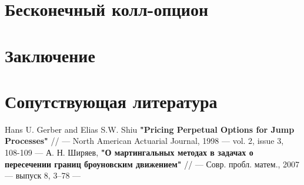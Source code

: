 \documentclass[a4paper,12pt]{article}
\theoremstyle{definition}
\begin{document}
\section{Бесконечный колл-опцион}

\section{Заключение}

\section{Сопутствующая литература}

\begin{thebibliography}{3}
Hans U. Gerber and Elias S.W. Shiu \textbf{"Pricing Perpetual Options for Jump Processes"} // --- North American Actuarial Journal, 1998 --- vol. 2, issue 3, 108-109 ---
А. Н. Ширяев, \textbf{"О мартингальных методах в задачах о пересечении границ броуновским движением"} // --- Совр. пробл. матем., 2007 --- выпуск 8, 3–78 ---
\end{thebibliography}

\appendix
\end{document}
